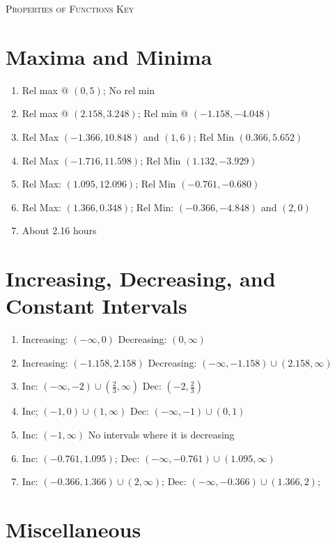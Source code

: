 \newpage

\textsc{Properties of Functions Key} 

\section*{Maxima and Minima}

\begin{enumerate}
	\item Rel max @ $(0,5)$; No rel min
	\item Rel max @ $(2.158, 3.248)$; Rel min @ $(-1.158, -4.048)$
	\item Rel Max $(-1.366,10.848)$ and $(1,6)$; \quad Rel Min $(0.366,5.652)$
    \item Rel Max $(-1.716,11.598)$; \quad Rel Min $(1.132,-3.929)$
    \item Rel Max: $(1.095, 12.096)$; \quad Rel Min $(-0.761, -0.680)$
    \item Rel Max: $(1.366, 0.348)$; \quad
    Rel Min: $(-0.366, -4.848)$ and $(2,0)$
	\item About 2.16 hours
\end{enumerate}

\section*{Increasing, Decreasing, and Constant Intervals}

\begin{enumerate}
	\item Increasing: $(-\infty, 0)$ \quad Decreasing: $(0, \infty)$
	\item Increasing: $(-1.158, 2.158)$ \quad Decreasing: $(-\infty, -1.158) \cup (2.158, \infty)$
    \item Inc: $(-\infty,-2) \cup \left(\frac{2}{3},\infty\right)$ \quad Dec: $\left(-2, \frac{2}{3}\right)$
    \item Inc; $(-1,0) \cup (1, \infty)$ \quad Dec: $(-\infty, -1) \cup (0,1)$
    \item Inc: $(-1,\infty)$ \quad No intervals where it is decreasing
    \item Inc: $(-0.761, 1.095)$; \quad Dec: $(-\infty, -0.761) \cup (1.095, \infty)$
    \item Inc: $(-0.366,1.366) \cup (2, \infty)$; \quad
    Dec: $(-\infty, -0.366) \cup (1.366,2)$;
\end{enumerate}

\section*{Miscellaneous}

